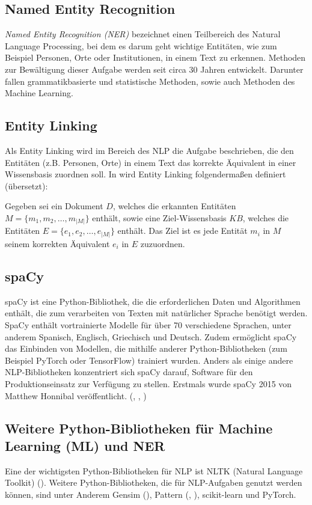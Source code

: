 \subsection{Named Entity Recognition}

\emph{Named Entity Recognition (\ac{NER})} bezeichnet einen Teilbereich des Natural Language Processing, bei dem es darum geht wichtige Entitäten, wie zum Beispiel Personen, Orte oder Institutionen, in einem Text zu erkennen. Methoden zur Bewältigung dieser Aufgabe werden seit circa 30 Jahren entwickelt. Darunter fallen grammatikbasierte und statistische Methoden, sowie auch Methoden des Machine Learning.

\subsection{Entity Linking}
Als Entity Linking wird im Bereich des NLP die Aufgabe beschrieben, die den Entitäten (z.B. Personen, Orte) in einem Text das korrekte Äquivalent in einer Wissensbasis zuordnen soll.
In \cite{shen_entity_2021} wird Entity Linking folgendermaßen definiert (übersetzt):
\begin{defn}
Gegeben sei ein Dokument $D$, welches die erkannten Entitäten $M=\{m_1, m_2, \dots, m_{|M|}\}$ enthält, sowie
eine Ziel-Wissensbasis $KB$, welches die Entitäten $E=\{e_1, e_2, \dots, e_{|M|}\}$ enthält. Das Ziel ist es 
jede Entität $m_i$ in $M$ seinem korrekten Äquivalent $e_i$ in $E$ zuzuordnen.
\end{defn}

\subsection{spaCy}
spaCy ist eine Python-Bibliothek, die die erforderlichen Daten und Algorithmen enthält, die zum verarbeiten von
Texten mit natürlicher Sprache benötigt werden. SpaCy enthält vortrainierte Modelle für über 70 verschiedene 
Sprachen, unter anderem Spanisch, Englisch, Griechisch und Deutsch. Zudem ermöglicht spaCy das Einbinden von 
Modellen, die mithilfe anderer Python-Bibliotheken (zum Beispiel PyTorch oder TensorFlow) trainiert wurden.
Anders als einige andere NLP-Bibliotheken konzentriert sich spaCy darauf, Software für den Produktionseinsatz 
zur Verfügung zu stellen. Erstmals wurde spaCy 2015 von Matthew Honnibal veröffentlicht. 
(\cite{vasiliev2020natural}, \cite{github_spacy}, \cite{spacy})

\subsection{Weitere Python-Bibliotheken für Machine Learning (ML) und NER}
Eine der wichtigsten Python-Bibliotheken für NLP ist NLTK (Natural Language Toolkit) (\cite{bird2006nltk}).
Weitere Python-Bibliotheken, die für NLP-Aufgaben genutzt werden können, sind unter Anderem
Gensim (\cite{vrehuuvrek2011gensim}), Pattern (\cite{de2012pattern}, \cite{github_pattern}), 
scikit-learn und PyTorch.


